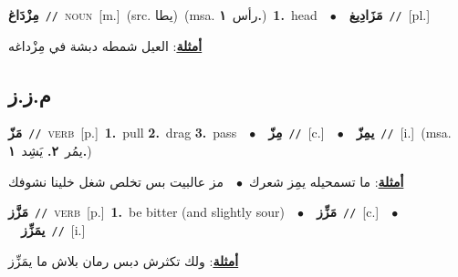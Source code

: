 \documentclass[10pt,a4paper,twoside]{article} %
\begin{document}
\begin{multicols}{2}
{\setlength\topsep{0pt}\textbf{\foreignlanguage{arabic}{مِزْدَاغ}}\ {\color{gray}\texttt{//}\color{black}}\ \textsc{noun}\ [m.]\ (src. \color{gray}\foreignlanguage{arabic}{يطا}\color{black})\ \color{gray}(msa. \foreignlanguage{arabic}{رأس}~\foreignlanguage{arabic}{\textbf{١.}})\color{black}\ \textbf{1.}~head\ \ $\bullet$\ \ \setlength\topsep{0pt}\textbf{\foreignlanguage{arabic}{مَزَادِيغ}}\ {\color{gray}\texttt{//}\color{black}}\ [pl.]\  \begin{flushright}\color{gray}\foreignlanguage{arabic}{\textbf{\underline{\foreignlanguage{arabic}{أمثلة}}}: العيل شمطه دبشة في مِزْداغه}\end{flushright}\color{black}} \vspace{2mm}

\vspace{-3mm}
\subsection*{\color{blue}\foreignlanguage{arabic}{م.ز.ز}\color{blue}{}} 

{\setlength\topsep{0pt}\textbf{\foreignlanguage{arabic}{مَزّ}}\ {\color{gray}\texttt{//}\color{black}}\ \textsc{verb}\ [p.]\ \textbf{1.}~pull  \textbf{2.}~drag  \textbf{3.}~pass\ \ $\bullet$\ \ \setlength\topsep{0pt}\textbf{\foreignlanguage{arabic}{مِزّ}}\ {\color{gray}\texttt{//}\color{black}}\ [c.]\ \ $\bullet$\ \ \setlength\topsep{0pt}\textbf{\foreignlanguage{arabic}{يمِزّ}}\ {\color{gray}\texttt{//}\color{black}}\ [i.]\ \color{gray}(msa. \foreignlanguage{arabic}{يمُر}~\foreignlanguage{arabic}{\textbf{٢.}}  \foreignlanguage{arabic}{يَشِد}~\foreignlanguage{arabic}{\textbf{١.}})\color{black}\  \begin{flushright}\color{gray}\foreignlanguage{arabic}{\textbf{\underline{\foreignlanguage{arabic}{أمثلة}}}: ما تسمحيله يمِز شعرك\ $\bullet$\ \  مز عالبيت بس تخلص شغل خلينا نشوفك}\end{flushright}\color{black}} \vspace{2mm}

{\setlength\topsep{0pt}\textbf{\foreignlanguage{arabic}{مَزَّز}}\ {\color{gray}\texttt{//}\color{black}}\ \textsc{verb}\ [p.]\ \textbf{1.}~be bitter (and slightly sour)\ \ $\bullet$\ \ \setlength\topsep{0pt}\textbf{\foreignlanguage{arabic}{مَزِّز}}\ {\color{gray}\texttt{//}\color{black}}\ [c.]\ \ $\bullet$\ \ \setlength\topsep{0pt}\textbf{\foreignlanguage{arabic}{يمَزِّز}}\ {\color{gray}\texttt{//}\color{black}}\ [i.]\  \begin{flushright}\color{gray}\foreignlanguage{arabic}{\textbf{\underline{\foreignlanguage{arabic}{أمثلة}}}: ولك تكثرش دبس رمان بلاش ما يمَزِّز}\end{flushright}\color{black}} \vspace{2mm}


\end{multicols}
\end{document}
